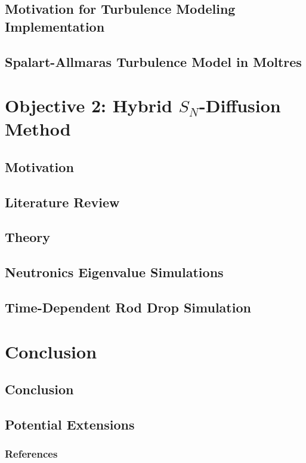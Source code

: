 \documentclass[8pt]{beamer}
\begin{document}
\subsection{Motivation for Turbulence Modeling Implementation}

\subsection{Spalart-Allmaras Turbulence Model in Moltres}


\section{Objective 2: Hybrid $S_N$-Diffusion Method}
\subsection{Motivation}

\subsection{Literature Review}

\subsection{Theory}

\subsection{Neutronics Eigenvalue Simulations}



\subsection{Time-Dependent Rod Drop Simulation}


\section{Conclusion}
\subsection{Conclusion}

\subsection{Potential Extensions}


\begin{frame}
  \frametitle{References}
{
\tiny
\printbibliography[heading=bibintoc,title={References}]
}

\end{frame}


\end{document}
